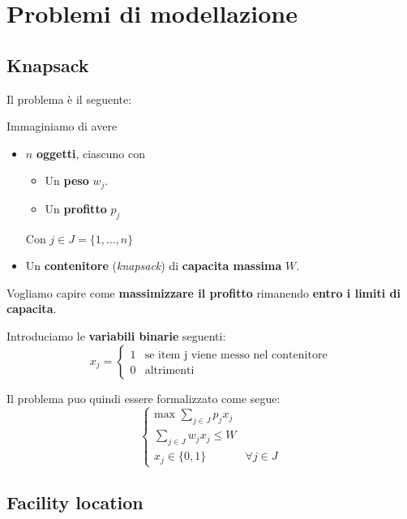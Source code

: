\chapter{Problemi di modellazione}

\section{Knapsack}

Il problema è il seguente:

\begin{exa}[KNAPSACK]
    Immaginiamo di avere
    \begin{itemize}
        \item $n$ \textbf{oggetti}, ciascuno con
            \begin{itemize}
                \item Un \textbf{peso} $w_j$.
                \item Un \textbf{profitto} $p_j$
            \end{itemize}
            Con $j\in J = \{ 1,\ldots ,n \}  $
        \item Un \textbf{contenitore} (\textit{knapsack}) 
            di \textbf{capacita massima} $W$.
    \end{itemize}
    Vogliamo capire come \textbf{massimizzare il profitto} 
    rimanendo \textbf{entro i limiti di capacita}.
\end{exa}

Introduciamo le \textbf{variabili binarie} seguenti:
\[
    x_j = \begin{cases}
        1 & \text{se item j viene messo nel contenitore} \\ 
        0 & \text{altrimenti}
    \end{cases}
\]

Il problema puo quindi essere formalizzato come segue:
\[
    \begin{cases}
        \text{max } \sum_{j \in J} p_{j} x_{j} \\ 
        \sum_{j\in J} w_{j} x_{j} \le W \\ 
        x_{j} \in \{0,1\} & \forall j \in J
    \end{cases}
\]

\section{Facility location}


